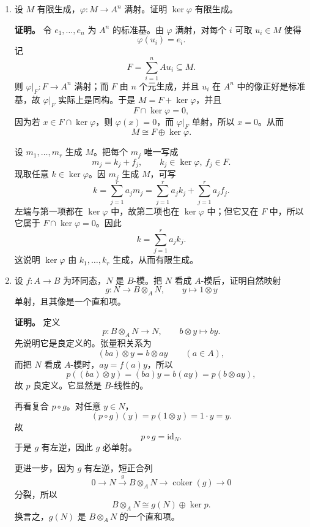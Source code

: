 \documentclass[a4paper]{ctexart}
\begin{document}
\begin{enumerate}[leftmargin=*, label=\textbf{2.\arabic*.}]
由右正合性，
\[
(N/u(M))/\mathfrak a(N/u(M)) \cong C/\mathfrak a C
\]
而题设说 \(M/\mathfrak aM\to N/\mathfrak aN\) 满射，这恰好等价于
\[
C/\mathfrak a C=0.
\]
于是 \(\mathfrak a C=C\)。又 \(\mathfrak a\subseteq J(A)\)，由 Nakayama 引理，可直接应用 \textit{Algebra III} 的 (III.Prop 1.2.13)，推出 \(C=0\)。因此 \(\operatorname{coker}(u)=0\)，即 \(u\) 满射。

\setcounter{enumi}{11}
\item 设 \(M\) 有限生成，\(\varphi:M\to A^n\) 满射。证明 \(\ker\varphi\) 有限生成。

\textbf{证明。}
令 \(e_1,\dots,e_n\) 为 \(A^n\) 的标准基。由 \(\varphi\) 满射，对每个 \(i\) 可取 \(u_i\in M\) 使得
\[
\varphi(u_i)=e_i.
\]
记
\[
F=\sum_{i=1}^n Au_i\subseteq M.
\]
则 \(\varphi|_F:F\to A^n\) 满射；而 \(F\) 由 \(n\) 个元生成，并且 \(u_i\) 在 \(A^n\) 中的像正好是标准基，故 \(\varphi|_F\) 实际上是同构。于是 \(M=F+\ker\varphi\)，并且
\[
F\cap \ker\varphi=0,
\]
因为若 \(x\in F\cap\ker\varphi\)，则 \(\varphi(x)=0\)，而 \(\varphi|_F\) 单射，所以 \(x=0\)。从而
\[
M\cong F\oplus\ker\varphi.
\]

设 \(m_1,\dots,m_r\) 生成 \(M\)。把每个 \(m_j\) 唯一写成
\[
m_j=k_j+f_j,\qquad k_j\in\ker\varphi,\ f_j\in F.
\]
现取任意 \(k\in\ker\varphi\)。因 \(m_j\) 生成 \(M\)，可写
\[
k=\sum_{j=1}^r a_jm_j=\sum_{j=1}^r a_jk_j+\sum_{j=1}^r a_jf_j.
\]
左端与第一项都在 \(\ker\varphi\) 中，故第二项也在 \(\ker\varphi\) 中；但它又在 \(F\) 中，所以它属于 \(F\cap\ker\varphi=0\)。因此
\[
k=\sum_{j=1}^r a_jk_j.
\]
这说明 \(\ker\varphi\) 由 \(k_1,\dots,k_r\) 生成，从而有限生成。

\setcounter{enumi}{12}
\item 设 \(f:A\to B\) 为环同态，\(N\) 是 \(B\)-模。把 \(N\) 看成 \(A\)-模后，证明自然映射
\[
g:N\to B\otimes_A N,\qquad y\mapsto 1\otimes y
\]
单射，且其像是一个直和项。

\textbf{证明。}
定义
\[
p:B\otimes_A N\to N,\qquad b\otimes y\mapsto by.
\]
先说明它是良定义的。张量积关系为
\[
(ba)\otimes y=b\otimes ay \qquad (a\in A),
\]
而把 \(N\) 看成 \(A\)-模时，\(ay=f(a)y\)，所以
\[
p((ba)\otimes y)=(ba)y=b(ay)=p(b\otimes ay),
\]
故 \(p\) 良定义。它显然是 \(B\)-线性的。

再看复合 \(p\circ g\)。对任意 \(y\in N\)，
\[
(p\circ g)(y)=p(1\otimes y)=1\cdot y=y.
\]
故
\[
p\circ g=\mathrm{id}_N.
\]
于是 \(g\) 有左逆，因此 \(g\) 必单射。

更进一步，因为 \(g\) 有左逆，短正合列
\[
0\to N\xrightarrow{g} B\otimes_A N\xrightarrow{} \operatorname{coker}(g)\to 0
\]
分裂，所以
\[
B\otimes_A N\cong g(N)\oplus \ker p.
\]
换言之，\(g(N)\) 是 \(B\otimes_A N\) 的一个直和项。
\end{enumerate}
\end{document}

